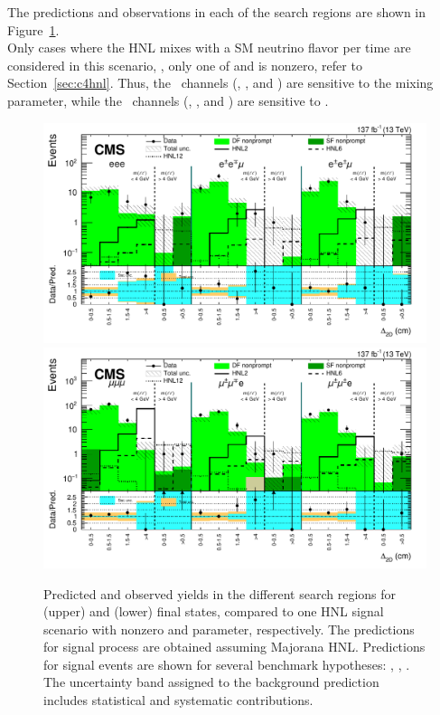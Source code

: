 The predictions and observations in each of the search regions are
shown in Figure~\ref{fig:finalyields_majorana_datacards}.\\
Only cases where the HNL mixes with a SM neutrino
flavor per time are considered in this scenario, \ie, only one of \mixpare and \mixparm is
nonzero, refer to Section~\ref{sec:c4hnl}.
Thus, the \eex~channels (\EEE, \EEMos, and
\EEMss) are sensitive to the \mixpare mixing
parameter, while the \mmx~channels (\MMM, \MMEos, and
\MMEss) are sensitive to \mixparm.

\begin{figure}[h!]
    \centering
    \includegraphics[width=.75\textwidth]{Figures/c6/results/ele_sr.pdf} \\
    \includegraphics[width=.75\textwidth]{Figures/c6/results/mu_sr.pdf}
    \caption{\label{fig:finalyields_majorana_datacards}
        Predicted and observed yields in the different search
        regions for (upper) \eex and (lower) \mmx final states,
        compared to one HNL signal scenario with nonzero \mixpare and
        \mixparm parameter, respectively. The predictions for signal
        process are obtained assuming Majorana HNL.
        Predictions for signal events are shown for several benchmark hypotheses:
        \HNLtwo, \HNLsix, \HNLtwelve.
        The uncertainty band assigned to the background prediction includes
        statistical and systematic contributions.
    }
\end{figure}



